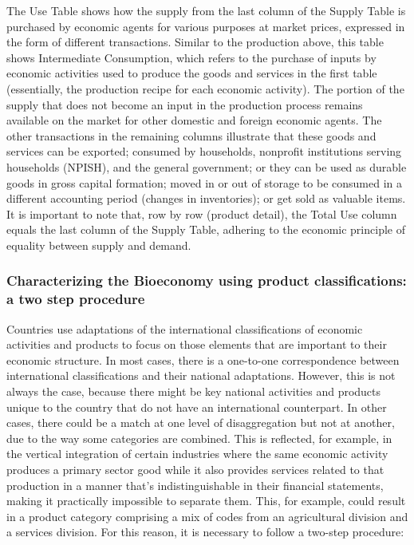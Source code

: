 \documentclass[
  letterpaper,
  DIV=11,
  numbers=noendperiod]{scrartcl}
\begin{document}
The Use Table shows how the supply from the last column of the Supply
Table is purchased by economic agents for various purposes at market
prices, expressed in the form of different transactions. Similar to the
production above, this table shows Intermediate Consumption, which
refers to the purchase of inputs by economic activities used to produce
the goods and services in the first table (essentially, the production
recipe for each economic activity). The portion of the supply that does
not become an input in the production process remains available on the
market for other domestic and foreign economic agents. The other
transactions in the remaining columns illustrate that these goods and
services can be exported; consumed by households, nonprofit institutions
serving households (NPISH), and the general government; or they can be
used as durable goods in gross capital formation; moved in or out of
storage to be consumed in a different accounting period (changes in
inventories); or get sold as valuable items. It is important to note
that, row by row (product detail), the Total Use column equals the last
column of the Supply Table, adhering to the economic principle of
equality between supply and demand.

\subsubsection{Characterizing the Bioeconomy using product
classifications: a two step
procedure}\label{characterizing-the-bioeconomy-using-product-classifications-a-two-step-procedure}

Countries use adaptations of the international classifications of
economic activities and products to focus on those elements that are
important to their economic structure. In most cases, there is a
one-to-one correspondence between international classifications and
their national adaptations. However, this is not always the case,
because there might be key national activities and products unique to
the country that do not have an international counterpart. In other
cases, there could be a match at one level of disaggregation but not at
another, due to the way some categories are combined. This is reflected,
for example, in the vertical integration of certain industries where the
same economic activity produces a primary sector good while it also
provides services related to that production in a manner that's
indistinguishable in their financial statements, making it practically
impossible to separate them. This, for example, could result in a
product category comprising a mix of codes from an agricultural division
and a services division. For this reason, it is necessary to follow a
two-step procedure:
\end{document}
